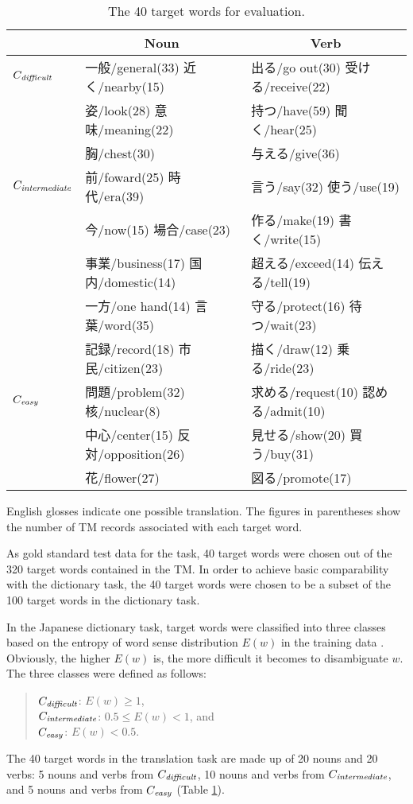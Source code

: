 \begin{table}[t]
 \caption{The 40 target words for evaluation.}  \label{tab:word}
 \begin{center}
 \begin{tabular}{l|l|l} \hline
  & \multicolumn{1}{c}{Noun} & \multicolumn{1}{|c}{Verb} \\ \hline
  $C_{{\it difficult}}$     
  & 一般/general(33) 近く/nearby(15) & 出る/go out(30) 受ける/receive(22) \\
  & 姿/look(28) 意味/meaning(22)     & 持つ/have(59) 聞く/hear(25) \\
  & 胸/chest(30)                     & 与える/give(36) \\ \hline
  $C_{{\it intermediate}}$  
  & 前/foward(25) 時代/era(39)          & 言う/say(32) 使う/use(19) \\
  & 今/now(15) 場合/case(23)            & 作る/make(19) 書く/write(15) \\
  & 事業/business(17) 国内/domestic(14) & 超える/exceed(14) 伝える/tell(19) \\
  & 一方/one hand(14) 言葉/word(35)     & 守る/protect(16) 待つ/wait(23) \\
  & 記録/record(18) 市民/citizen(23)    & 描く/draw(12) 乗る/ride(23) \\ \hline
  $C_{{\it easy}}$
  & 問題/problem(32) 核/nuclear(8)       & 求める/request(10) 認める/admit(10) \\
  & 中心/center(15) 反対/opposition(26)  & 見せる/show(20) 買う/buy(31) \\
  & 花/flower(27)                        & 図る/promote(17) \\ \hline
 \end{tabular}
 \end{center}
English glosses indicate one possible translation.
The figures in parentheses show the number of TM records associated with
each target word. 
\end{table}

As gold standard test data for the task, 40 target words were chosen out
of the 320 target words contained in the TM.  In order to achieve basic
comparability with the dictionary task, the 40 target words were chosen to
be a subset of the 100 target words in the dictionary task.

In the Japanese dictionary task, target words were classified into three
classes based on the entropy of word sense distribution $E(w)$ in the
training data \cite{Shirai03}.  Obviously, the higher $E(w)$ is, the
more difficult it becomes to disambiguate $w$.  The three classes were
defined as follows:
\begin{quote}
  $C_{{\it difficult}}$: $E(w) \ge 1$, \\
  $C_{{\it intermediate}}$: $0.5 \le E(w) < 1$, and \\
  $C_{{\it easy}}$: $E(w) < 0.5$.
\end{quote}
The 40 target words in the translation task are made up of 20 nouns and
20 verbs: 5 nouns and verbs from $C_{{\it difficult}}$, 10 nouns and verbs
from $C_{{\it intermediate}}$, and 5 nouns and verbs from $C_{{\it easy}}$ (Table
\ref{tab:word}).

